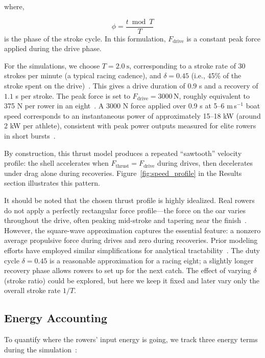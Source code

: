 \documentclass[12pt]{article}
\begin{document}
where,

\[
\phi = \frac{t \bmod T}{T}
\]
is the phase of the stroke cycle. In this formulation, $F_{\text{drive}}$ is a constant peak force applied during the drive phase.

For the simulations, we choose $T = 2.0\ \text{s}$, corresponding to a stroke rate of 30 strokes per minute (a typical racing cadence), and $\delta = 0.45$ (i.e., 45\% of the stroke spent on the drive)~\cite{kleshnevnewsletter, kleshnevnewsletter}. This gives a drive duration of $0.9$ s and a recovery of $1.1$ s per stroke. The peak force is set to $F_{\text{drive}} = 3000\,\text{N}$, roughly equivalent to 375 N per rower in an eight~\cite{baudouinhawkins2002}. A 3000 N force applied over 0.9 s at 5--6 m\,s$^{-1}$ boat speed corresponds to an instantaneous power of approximately 15--18 kW (around 2 kW per athlete), consistent with peak power outputs measured for elite rowers in short bursts~\cite{hofmijster2010, kleshnevnewsletter}.

By construction, this thrust model produces a repeated ``sawtooth'' velocity profile: the shell accelerates when $F_{\text{thrust}} = F_{\text{drive}}$ during drives, then decelerates under drag alone during recoveries. Figure~\ref{fig:speed_profile} in the Results section illustrates this pattern.

It should be noted that the chosen thrust profile is highly idealized. Real rowers do not apply a perfectly rectangular force profile—the force on the oar varies throughout the drive, often peaking mid-stroke and tapering near the finish~\cite{kleshnevnewsletter, sandersonmartindale1986}. However, the square-wave approximation captures the essential feature: a nonzero average propulsive force during drives and zero during recoveries. Prior modeling efforts have employed similar simplifications for analytical tractability~\cite{brearleydemestre1996}. The duty cycle $\delta = 0.45$ is a reasonable approximation for a racing eight; a slightly longer recovery phase allows rowers to set up for the next catch. The effect of varying $\delta$ (stroke ratio) could be explored, but here we keep it fixed and later vary only the overall stroke rate $1/T$.

\newpage

\subsection{Energy Accounting}

To quantify where the rowers’ input energy is going, we track three energy terms during the simulation~\cite{lazauskas1997, vanholst2004}:
\end{document}
